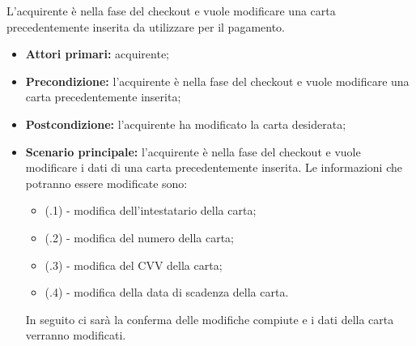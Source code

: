 L'acquirente è nella fase del checkout e vuole modificare una carta precedentemente inserita da utilizzare per il pagamento.
\begin{itemize}
    \item \textbf{Attori primari:} acquirente;
    \item \textbf{Precondizione:} l'acquirente è nella fase del checkout e vuole modificare una carta precedentemente inserita;
    \item \textbf{Postcondizione:} l'acquirente ha modificato la carta desiderata;
    \item \textbf{Scenario principale:} l'acquirente è nella fase del checkout e vuole modificare i dati di una carta precedentemente inserita. Le informazioni che potranno essere modificate sono:
    \begin{itemize}
        \item (\actualUC.1) - modifica dell'intestatario della carta;
        \item (\actualUC.2) - modifica del numero della carta;
        \item (\actualUC.3) - modifica del CVV della carta;
        \item (\actualUC.4) - modifica della data di scadenza della carta.
    \end{itemize}
    In seguito ci sarà la conferma delle modifiche compiute e i dati della carta verranno modificati.
\end{itemize}

\resetSubUC


